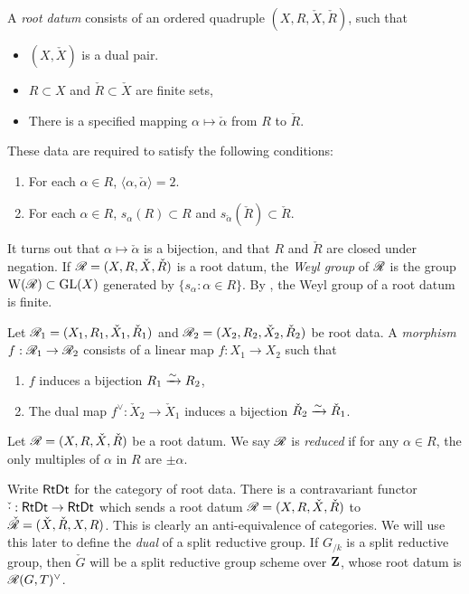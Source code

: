 \begin{definition}
A \emph{root datum} consists of an ordered quadruple $(X,R,\check X,\check R)$, 
such that 
\begin{itemize}
  \item $(X,\check X)$ is a dual pair. 
  \item $R\subset X$ and $\check R\subset \check X$ are finite sets, 
  \item There is a specified mapping $\alpha\mapsto \check\alpha$ from $R$ to 
    $\check R$. 
\end{itemize}
These data are required to satisfy the following conditions:
\begin{enumerate}
  \item For each $\alpha\in R$, $\langle\alpha,\check\alpha\rangle=2$. 
  \item For each $\alpha\in R$, $s_\alpha(R)\subset R$ and 
    $s_{\check\alpha}(\check R)\subset \check R$. 
\end{enumerate}
\end{definition}

It turns out that $\alpha\mapsto \check\alpha$ is a bijection, and that 
$R$ and $\check R$ are closed under negation. If $\mathscr{R}=(X,R,\check X,\check R)$ 
is a root datum, the \emph{Weyl group} of $\mathscr{R}$ is the group  
$\operatorname{W}(\mathscr{R})\subset \operatorname{GL}(X)$ generated by $\{s_\alpha:\alpha\in R\}$. By 
\cite[XXI 1.2.8]{sga3-iii}, the Weyl group of a root datum is finite. 

\begin{definition}
Let $\mathscr{R}_1=(X_1,R_1,\check X_1,\check R_1)$ and 
$\mathscr{R}_2=(X_2,R_2,\check X_2,\check R_2)$ be root data. A \emph{morphism} 
$f:\mathscr{R}_1\to \mathscr{R}_2$ consists of a linear map $f:X_1\to X_2$ such that 
\begin{enumerate}
  \item $f$ induces a bijection $R_1\xrightarrow\sim R_2$, 
  \item The dual map $f^\vee:\check X_2\to \check X_1$ induces a bijection 
    $\check R_2\xrightarrow\sim \check R_1$. 
\end{enumerate}
\end{definition}

\begin{definition}
Let $\mathscr{R}=(X,R,\check X,\check R)$ be a root datum. We say $\mathscr{R}$ is 
\emph{reduced} if for any $\alpha\in R$, the only multiples of $\alpha$ in 
$R$ are $\pm \alpha$. 
\end{definition}

Write $\mathsf{RtDt}$ for the category of root data. There is a contravariant 
functor $\check\cdot:\mathsf{RtDt}\to \mathsf{RtDt}$ which sends a root datum 
$\mathscr{R}=(X,R,\check X,\check R)$ to $\check{\mathscr{R}}=(\check X,\check R,X,R)$. This is 
clearly an anti-equivalence of categories. We will use this later to define 
the \emph{dual} of a split reductive group. If $G_{/k}$ is a split reductive 
group, then $\check G$ will be a split reductive group scheme over $\mathbf{Z}$, whose 
root datum is $\mathscr{R}(G,T)^\vee$. 

